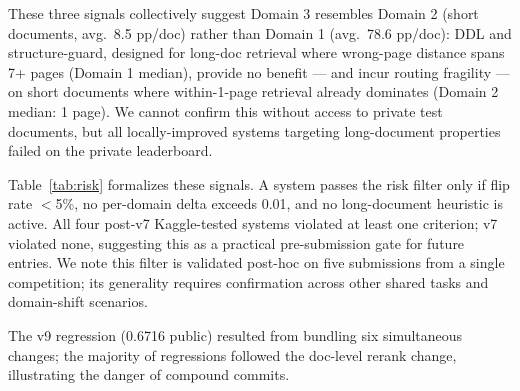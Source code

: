 \documentclass[11pt]{article}
\begin{document}
These three signals collectively suggest Domain 3 resembles Domain 2 (short documents, avg.\ 8.5 pp/doc) rather than Domain 1 (avg.\ 78.6 pp/doc): DDL and structure-guard, designed for long-doc retrieval where wrong-page distance spans 7+ pages (Domain 1 median), provide no benefit — and incur routing fragility — on short documents where within-1-page retrieval already dominates (Domain 2 median: 1 page). We cannot confirm this without access to private test documents, but all locally-improved systems targeting long-document properties failed on the private leaderboard.

\begin{table}[t]
\centering
{}
\caption{Risk signals vs.\ Kaggle public outcome. ``Flip\%'' = doc change rate vs.\ v7 (full-dev). ``Imbal.'' = any single per-domain $|\Delta|{>}0.01$ in full-dev composite vs.\ v7. ``Long-doc'' = heuristic targeting docs $\geq$25 pages. All four regressed systems showed $\geq$1 high-risk signal; v7 showed none.}
\label{tab:risk}
\end{table}

Table~\ref{tab:risk} formalizes these signals. A system passes the risk filter only if flip rate $<$5\%, no per-domain delta exceeds 0.01, and no long-document heuristic is active. All four post-v7 Kaggle-tested systems violated at least one criterion; v7 violated none, suggesting this as a practical pre-submission gate for future entries. We note this filter is validated post-hoc on five submissions from a single competition; its generality requires confirmation across other shared tasks and domain-shift scenarios.

The v9 regression (0.6716 public) resulted from bundling six simultaneous changes; the majority of regressions followed the doc-level rerank change, illustrating the danger of compound commits.
\end{document}
